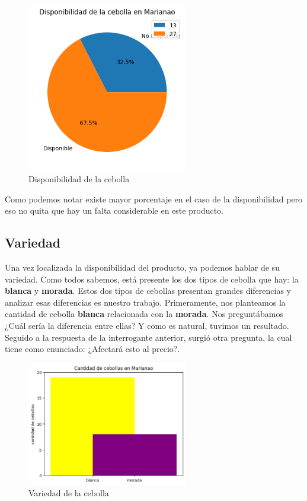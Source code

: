 \documentclass[a4paper,12pt]{article}
\begin{document}
\begin{figure}[h]
    \center
    \includegraphics[width=7cm]{disponibilidad.png}
    \caption{Disponibilidad de la cebolla}
    \label{fig:logo}
\end{figure}

Como podemos notar existe mayor porcentaje en el caso de la disponibilidad pero eso no quita que hay un falta considerable 
en este producto.

\subsection{Variedad}
Una vez localizada la disponibilidad del producto, ya podemos hablar de su variedad. 
Como todos sabemos, está presente los dos tipos de cebolla que hay: la \textbf{blanca} y \textbf{morada}. 
Estos dos tipos de cebollas presentan grandes diferencias y analizar esas diferencias es nuestro trabajo. 
Primeramente, nos planteamos la cantidad de cebolla \textbf{blanca} relacionada con la \textbf{morada}. 
Nos preguntábamos ¿Cuál sería la diferencia entre ellas? Y como es natural, tuvimos un resultado. 
Seguido a la respuesta de la interrogante anterior, surgió otra pregunta, la cual tiene como enunciado: ¿Afectará esto al precio?.

\begin{figure}[h]
    \center
    \includegraphics[width=7cm]{variedad.png}
    \caption{Variedad de la cebolla}
    \label{fig:logo}
\end{figure}
\end{document}
